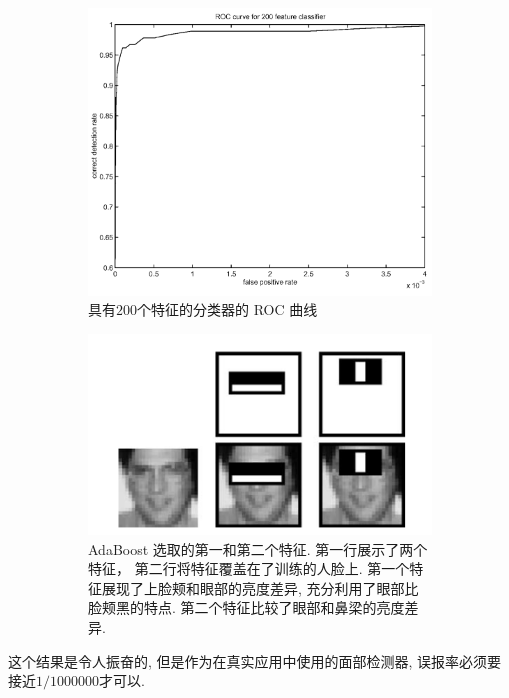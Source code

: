 \documentclass[a4paper,utf8,11pt]{ctexart}
\renewcommand{\captionlabelfont}{\kaishu\zihao{5}}
\begin{document}
\begin{figure}
\center
\begin{subfigure}{0.3\textwidth}
\includegraphics[width=\textwidth]{200.png}
\renewcommand{\captionlabelfont}{\kaishu\zihao{6}}
\caption{具有$200$个特征的分类器的 ROC 曲线}
\label{fig:f2}
\end{subfigure}
\quad\quad\quad\quad
\begin{subfigure}{0.3\textwidth}
\includegraphics[width=\textwidth]{eye.png}
\renewcommand{\captionlabelfont}{\kaishu\zihao{6}}
\caption{AdaBoost 选取的第一和第二个特征. 第一行展示了两个特征， 第二行将特征覆盖在了训练的人脸上. 第一个特征展现了上脸颊和眼部的亮度差异, 充分利用了眼部比脸颊黑的特点. 第二个特征比较了眼部和鼻梁的亮度差异.}
\label{fig:eye}
\end{subfigure}
\caption{}
\end{figure}
这个结果是令人振奋的, 但是作为在真实应用中使用的面部检测器, 误报率必须要接近$1/1000000$才可以.
\end{document}
